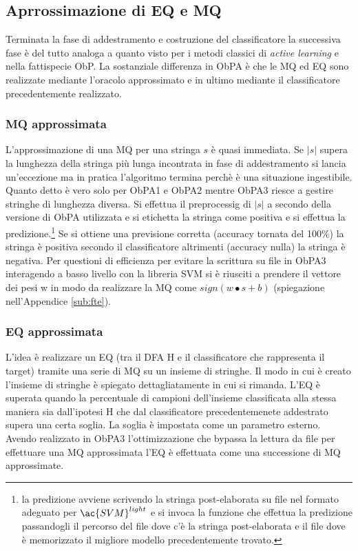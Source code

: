 \subsection{Aprrossimazione di EQ e MQ}
Terminata la fase di addestramento e costruzione del classificatore la successiva fase  è  del tutto analoga a quanto visto per i metodi classici di \textit{active learning} e nella fattispecie \ac{ObP}. La sostanziale differenza in \ac{ObPA} è che le \ac{MQ} ed \ac{EQ} sono realizzate mediante l'oracolo approssimato e in ultimo mediante il classificatore precedentemente realizzato.
\subsubsection{MQ approssimata}
L'approssimazione di una \ac{MQ} per una stringa $s$ è quasi immediata. Se $|s|$ supera la lunghezza della stringa più lunga incontrata in fase di addestramento si lancia un'eccezione ma in pratica l'algoritmo termina perchè è una situazione ingestibile. Quanto detto è vero solo per \ac{ObPA}1 e \ac{ObPA}2 mentre \ac{ObPA}3 riesce a gestire stringhe di lunghezza diversa. Si effettua il preprocessig di $|s|$ a secondo della versione di \ac{ObPA} utilizzata e si etichetta la stringa come positiva e si effettua la predizione.\footnote{la predizione avviene scrivendo la stringa post-elaborata su file nel formato adeguato per $\ac{SVM}^{light}$ e si invoca la funzione che effettua la predizione passandogli il percorso del file dove c'è la stringa post-elaborata e il file dove è memorizzato il migliore modello precedentemente trovato.} Se si ottiene una previsione corretta (accuracy tornata del 100$\%$) la stringa è positiva secondo il classificatore altrimenti (accuracy nulla) la stringa è negativa. Per questioni di efficienza per evitare la scrittura su file in \ac{ObPA}3 interagendo a basso livello con la libreria \ac{SVM} si è riusciti a prendere il vettore dei pesi w in modo da realizzare la \ac{MQ} come $sign(w \bullet s + b)$ (spiegazione nell'Appendice  \ref{sub:fte}).
 
 \subsubsection{EQ approssimata}
L'idea è realizzare un \ac{EQ} (tra il \ac{DFA} \ac{H} e il classificatore che rappresenta il target) tramite una serie di \ac{MQ} su un insieme di stringhe. Il modo in cui è creato l'insieme di stringhe è spiegato dettagliatamente in \label{sub:ceq} cui si rimanda. L'\ac{EQ} è superata quando la percentuale di campioni dell'insieme  classificata alla stessa maniera sia dall'ipotesi \ac{H} che dal classificatore precedentemenete addestrato supera una certa soglia. La soglia è impostata come un parametro esterno. 
Avendo realizzato in \ac{ObPA}3 l'ottimizzazione che bypassa la lettura da file per effettuare una \ac{MQ} approssimata l'\ac{EQ} è effettuata come una successione di \ac{MQ} approssimate.



